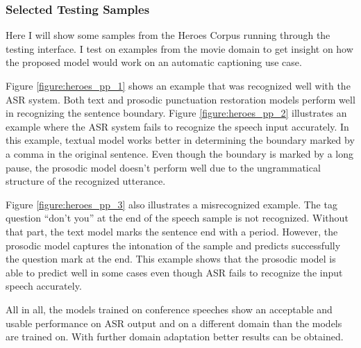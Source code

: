 \subsubsection{Selected Testing Samples}
Here I will show some samples from the Heroes Corpus running through the testing interface. I test on examples from the movie domain to get insight on how the proposed model would work on an automatic captioning use case. 

Figure \ref{figure:heroes_pp_1} shows an example that was recognized well with the ASR system. Both text and prosodic punctuation restoration models perform well in recognizing the sentence boundary. Figure \ref{figure:heroes_pp_2} illustrates an example where the ASR system fails to recognize the speech input accurately. In this example, textual model works better in determining the boundary marked by a comma in the original sentence. Even though the boundary is marked by a long pause, the prosodic model doesn't perform well due to the ungrammatical structure of the recognized utterance. 

Figure \ref{figure:heroes_pp_3} also illustrates a misrecognized example. The tag question ``don't you'' at the end of the speech sample is not recognized. Without that part, the text model marks the sentence end with a period. However, the prosodic model captures the intonation of the sample and predicts successfully the question mark at the end. This example shows that the prosodic model is able to predict well in some cases even though ASR fails to recognize the input speech accurately. 

All in all, the models trained on conference speeches show an acceptable and usable performance on ASR output and on a different domain than the models are trained on. With further domain adaptation better results can be obtained. 

